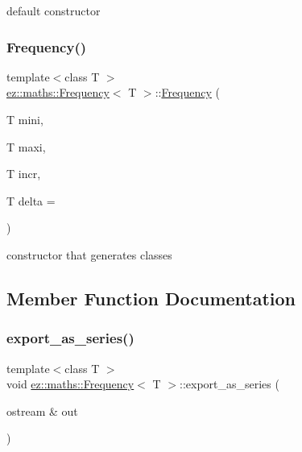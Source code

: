 default constructor \mbox{\label{classez_1_1maths_1_1Frequency_a5fe6cf61394f7fc424c4d93392f734a2}} 
\subsubsection{\texorpdfstring{Frequency()}{Frequency()}\hspace{0.1cm}{\footnotesize\ttfamily [2/2]}}
{\footnotesize\ttfamily template$<$class T $>$ \\
\hyperlink{classez_1_1maths_1_1Frequency}{ez\+::maths\+::\+Frequency}$<$ T $>$\+::\hyperlink{classez_1_1maths_1_1Frequency}{Frequency} (\begin{DoxyParamCaption}\item[{T}]{mini,  }\item[{T}]{maxi,  }\item[{T}]{incr,  }\item[{T}]{delta = {} }\end{DoxyParamCaption})\hspace{0.3cm}{\ttfamily [inline]}}

constructor that generates classes 

\subsection{Member Function Documentation}
\mbox{\label{classez_1_1maths_1_1Frequency_af24be0f62175280c79ef1107f4a07b8d}} 
\subsubsection{\texorpdfstring{export\+\_\+as\+\_\+series()}{export\_as\_series()}}
{\footnotesize\ttfamily template$<$class T $>$ \\
void \hyperlink{classez_1_1maths_1_1Frequency}{ez\+::maths\+::\+Frequency}$<$ T $>$\+::export\+\_\+as\+\_\+series (\begin{DoxyParamCaption}\item[{ostream \&}]{out }\end{DoxyParamCaption})\hspace{0.3cm}{\ttfamily [inline]}}

